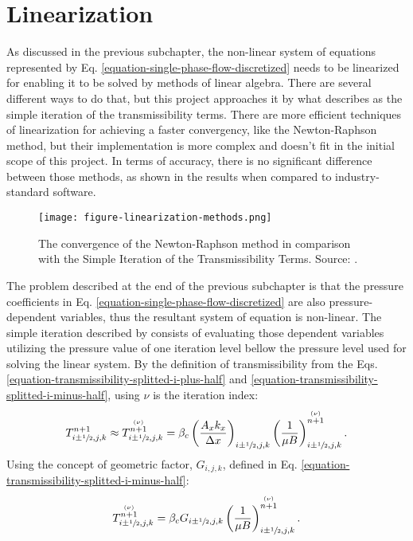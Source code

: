 \section{Linearization}
\label{section-linearization}

As discussed in the previous subchapter, the non-linear system of equations represented by Eq. \ref{equation-single-phase-flow-discretized} needs to be linearized for enabling it to be solved by methods of linear algebra.
%
There are several different ways to do that, but this project approaches it by what \cite{Ertekin2001} describes as the simple iteration of the transmissibility terms.
%
There are more efficient techniques of linearization for achieving a faster convergency, like the Newton-Raphson method, but their implementation is more complex and doesn't fit in the initial scope of this project.
%
In terms of accuracy, there is no significant difference between those methods, as shown in the results when compared to industry-standard software.
%
\begin{figure}[H]
	\centering
	\texttt{[image: figure-linearization-methods.png]}\\
	\caption{The convergence of the Newton-Raphson method in comparison with the Simple Iteration of the Transmissibility Terms. Source: \cite{Ertekin2001}.}
	\label{figure-linearization-methods}
\end{figure}
%
The problem described at the end of the previous subchapter is that the pressure coefficients in Eq. \ref{equation-single-phase-flow-discretized} are also pressure-dependent variables, thus the resultant system of equation is non-linear.
%
The simple iteration described by \cite{Ertekin2001} consists of evaluating those dependent variables utilizing the pressure value of one iteration level bellow the pressure level used for solving the linear system.
%
By the definition of transmissibility from the Eqs. \ref{equation-transmissibility-splitted-i-plus-half} and \ref{equation-transmissibility-splitted-i-minus-half}, using $\nu$ is the iteration index:
%
\begin{align}
	T^{n+1}_{i\pm \sfrac{1}{2},j,k} \approx T^{\stackrel{(\nu)}{n+1}}_{i\pm \sfrac{1}{2},j,k}= \beta_c\left(\frac{A_x k_x}{\Delta x}\right)_{i\pm \sfrac{1}{2},j,k}\left( \frac{1}{\mu B}\right)_{i\pm \sfrac{1}{2},j,k}^{\stackrel{(\nu)}{n+1}}.
\end{align}
%
Using the concept of geometric factor, $G_{i,j,k}$, defined in Eq. \ref{equation-transmissibility-splitted-i-minus-half}:
%
\begin{align}
	T^{\stackrel{(\nu)}{n+1}}_{i\pm \sfrac{1}{2},j,k}= \beta_c G_{i\pm \sfrac{1}{2},j,k}\left( \frac{1}{\mu B}\right)_{i\pm 	\sfrac{1}{2},j,k}^{\stackrel{(\nu)}{n+1}}.
\end{align}
